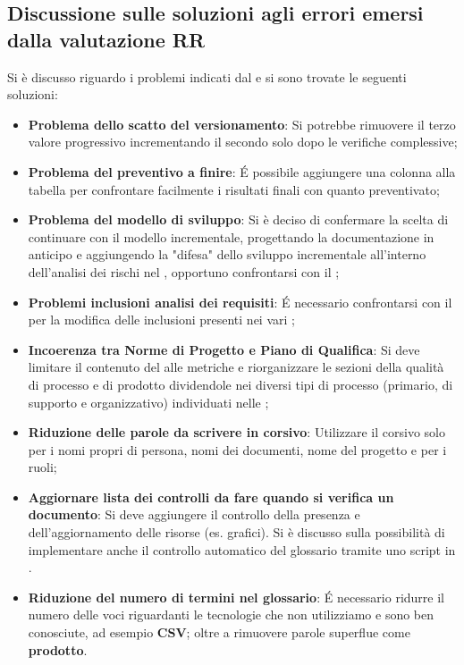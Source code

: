 \subsection{Discussione sulle soluzioni agli errori emersi dalla valutazione RR}
Si è discusso riguardo i problemi indicati dal \VT e si sono trovate le seguenti soluzioni:
\begin{itemize}
	\item \textbf{Problema dello scatto del versionamento}: Si potrebbe rimuovere il terzo valore progressivo incrementando il secondo solo dopo le verifiche complessive;
	\item \textbf{Problema del preventivo a finire}: É possibile aggiungere una colonna alla tabella per confrontare facilmente i risultati finali con quanto preventivato;
	\item \textbf{Problema del modello di sviluppo}: Si è deciso di confermare la scelta di continuare con il modello incrementale, progettando la documentazione in anticipo e aggiungendo la "difesa" dello sviluppo incrementale all'interno dell'analisi dei rischi nel \PdP, opportuno confrontarsi con il \VT;
	\item \textbf{Problemi inclusioni analisi dei requisiti}: É necessario confrontarsi con il \CR per la modifica delle inclusioni presenti nei vari ;
	\item \textbf{Incoerenza tra Norme di Progetto e Piano di Qualifica}: Si deve limitare il contenuto del \PdQ alle metriche e riorganizzare le sezioni della qualità di processo e di prodotto dividendole nei diversi tipi di processo (primario, di supporto e organizzativo) individuati nelle \NdP;
	\item \textbf{Riduzione delle parole da scrivere in corsivo}: Utilizzare il corsivo solo per i nomi propri di persona, nomi dei documenti, nome del progetto e per i ruoli;
	\item \textbf{Aggiornare lista dei controlli da fare quando si verifica un documento}: Si deve aggiungere il controllo della presenza e dell'aggiornamento delle risorse (es. grafici). Si è discusso sulla possibilità di implementare anche il controllo automatico del glossario tramite uno script in .
	\item \textbf{Riduzione del numero di termini nel glossario}: É necessario ridurre il numero delle voci riguardanti le tecnologie che non utilizziamo e sono ben conosciute, ad esempio \textbf{CSV}; oltre a rimuovere parole superflue come \textbf{prodotto}.
\end{itemize}
